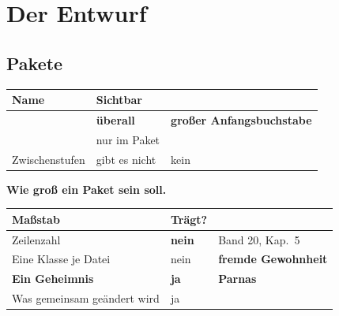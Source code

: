 \part{Der Entwurf}

\chapter{Pakete}\label{kap:pakete}

\begin{merksatz}
\begin{center}
\renewcommand{\arraystretch}{1.5}
\begin{tabular}{@{}P{2.8cm}P{2.4cm}P{2.8cm}@{}}
\toprule
\textbf{Name} & \textbf{Sichtbar} & \\
\midrule
{} & \textbf{überall} & \textbf{großer Anfangsbuchstabe}\\
 & nur im Paket & \\
Zwischenstufen & \textcolor{akzent}{gibt es nicht} & \textcolor{akzent}{kein }\\
\bottomrule
\end{tabular}
\end{center}

\begin{center}
\begin{minipage}{0.88\textwidth}
\end{minipage}
\end{center}

\textbf{Wie groß ein Paket sein soll.}

\begin{center}
\renewcommand{\arraystretch}{1.5}
\begin{tabular}{@{}P{3.0cm}P{2.4cm}P{2.6cm}@{}}
\toprule
\textbf{Maßstab} & \textbf{Trägt?} & \\
\midrule
Zeilenzahl & \textcolor{akzent}{\textbf{nein}} & \textcolor{akzent}{Band 20, Kap.~5}\\
Eine Klasse je Datei & \textcolor{akzent}{nein} & \textbf{fremde Gewohnheit}\\
\textbf{Ein Geheimnis} & \textcolor{gruen}{\textbf{ja}} & \textcolor{gruen}{\textbf{Parnas}}\\
Was gemeinsam geändert wird & \textcolor{gruen}{ja} & \\
\bottomrule
\end{tabular}
\end{center}


\end{merksatz}
